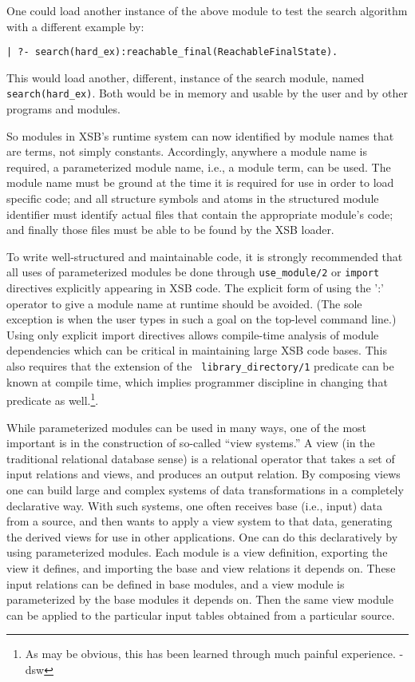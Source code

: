 One could load another instance of the above module to test the search
algorithm with a different example by:
\begin{verbatim}
| ?- search(hard_ex):reachable_final(ReachableFinalState).
\end{verbatim}
This would load another, different, instance of the search module,
named {\tt search(hard\_ex)}.  Both would be in memory and usable by
the user and by other programs and modules.

So modules in XSB's runtime system can now identified by module names
that are terms, not simply constants. Accordingly, anywhere a module
name is required, a parameterized module name, i.e., a module term,
can be used.  The module name must be ground at the time it is
required for use in order to load specific code; and all structure
symbols and atoms in the structured module identifier must identify
actual files that contain the appropriate module's code; and finally
those files must be able to be found by the XSB loader.

To write well-structured and maintainable code, it is strongly
recommended that all uses of parameterized modules be done through
{\tt use\_module/2} or {\tt import} directives explicitly appearing in
XSB code.  The explicit form of using the ':' operator to give a
module name at runtime should be avoided.  (The sole exception is when
the user types in such a goal on the top-level command line.)  Using
only explicit import directives allows compile-time analysis of module
dependencies which can be critical in maintaining large XSB code
bases. This also requires that the extension of the {\tt
  library\_directory/1} predicate can be known at compile time, which
implies programmer discipline in changing that predicate as
well.\footnote{As may be obvious, this has been learned through much
  painful experience. -dsw}.

While parameterized modules can be used in many ways, one of the most
important is in the construction of so-called ``view systems.''  A view
(in the traditional relational database sense) is a relational
operator that takes a set of input relations and views, and produces
an output relation.  By composing views one can build large and
complex systems of data transformations in a completely declarative
way.  With such systems, one often receives base (i.e., input) data
from a source, and then wants to apply a view system to that data,
generating the derived views for use in other applications.  One can
do this declaratively by using parameterized modules.  Each module is
a view definition, exporting the view it defines, and importing the
base and view relations it depends on.  These input relations can be
defined in base modules, and a view module is parameterized by the
base modules it depends on.  Then the same view module can be applied
to the particular input tables obtained from a particular source.




